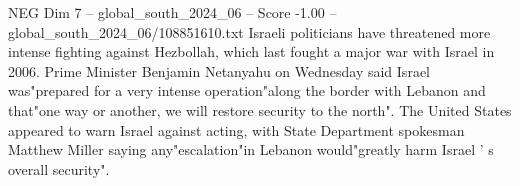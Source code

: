 \begin{textsample}{NEG Dim 7 – global\_south\_2024\_06 – Score -1.00 – global\_south\_2024\_06/108851610.txt}
Israeli politicians have threatened more intense fighting against Hezbollah, which last fought a major war with Israel in 2006.
Prime Minister Benjamin Netanyahu on Wednesday said Israel was"prepared for a very intense operation"along the border with Lebanon and that"one way or another, we will restore security to the north".
The United States appeared to warn Israel against acting, with State Department spokesman Matthew Miller saying any"escalation"in Lebanon would"greatly harm Israel ' s overall security".

\end{textsample}
